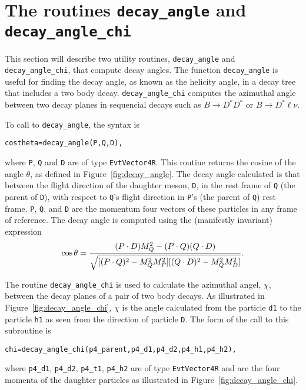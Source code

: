 \section{The routines {\tt decay\_angle} and {\tt decay\_angle\_chi}}
\label{sect:evtutil}

This section will describe two utility routines, 
{\tt decay\_angle} and  {\tt decay\_angle\_chi},
that compute decay angles.  The function {\tt decay\_angle} is 
useful for finding the decay angle, as known as the helicity
angle, in a decay tree that includes a two body decay.
{\tt decay\_angle\_chi} computes the azimuthal angle between two decay
planes in sequencial decays such as $B \rightarrow D^* D^*$ or
$B \rightarrow D^* \ell \nu$.

To call to {\tt decay\_angle}, the syntax is 
\begin{verbatim} 
costheta=decay_angle(P,Q,D),
\end{verbatim}
where {\tt P}, {\tt Q} and {\tt D} are of type {\tt EvtVector4R}.
This routine returns the cosine of the angle $\theta$, as defined in
Figure~\ref{fig:decay_angle}. The decay angle calculated is that between
the flight direction of the 
daughter meson, {\tt D}, in the rest frame of {\tt Q} (the parent of {\tt D}),
with respect to {\tt Q}'s
flight direction in {\tt P}'s (the parent of {\tt Q})
rest frame. {\tt P}, {\tt Q}, and {\tt D}
are the momentum four vectors of these particles in any frame of reference.
The decay angle is
computed using the (manifestly invariant) expression
\begin{equation}
\cos\theta = { {(P\cdot D) M^2_Q- (P\cdot Q)(Q\cdot D)} \over
        	      \sqrt{[(P\cdot Q)^2-M^2_QM^2_P]
		[(Q\cdot D)^2-M^2_QM^2_D]}}.
\end{equation}


The routine {\tt decay\_angle\_chi} is used to calculate the azimuthal 
angel, $\chi$, between the decay planes of a pair of two body
decays.
As illustrated in Figure~\ref{fig:decay_angle_chi},
$\chi$ is the
angle 
calculated from the particle {\tt d1} to the particle {\tt h1} as
seen from the direction of particle {\tt D}. The form of the call to this 
subroutine is 
\begin{verbatim} 
chi=decay_angle_chi(p4_parent,p4_d1,p4_d2,p4_h1,p4_h2),
\end{verbatim} 

where {\tt p4\_d1}, {\tt p4\_d2}, {\tt p4\_t1}, {\tt p4\_h2}
are of type {\tt EvtVector4R} and are the four momenta
of the daughter particles as illustrated in
Figure~\ref{fig:decay_angle_chi}.


